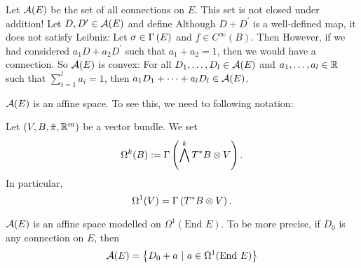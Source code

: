 \documentclass[main.tex]{subfiles}
\begin{document}
    Let $\mathcal{A}(E)$ be the set of all connections on $E$. This set is not closed under addition! Let $D, D^\prime \in \mathcal{A}(E)$ and define 
     Although $D + D^\prime$ is a well-defined map, it does not satisfy Leibniz: Let $\sigma \in \Gamma\left( E \right)$ and $f \in C^\infty(B)$. Then
    However, if we had considered $a_1 D + a_2 D^\prime$ such that $a_1 + a_2 = 1$, then we would have a connection. So $\mathcal{A}(E)$ is convex: For all $D_1, \dots, D_l \in \mathcal{A}(E)$ and $a_1, \dots, a_l \in \mathbb{R}$ such that $\sum_{i=1}^l a_i = 1$, then $a_1D_1 + \dots + a_l D_l \in \mathcal{A}(E)$.
    
    $\mathcal{A}(E)$ is an affine space. To see this, we need to following notation:
    
    \begin{notation}
    Let $(V, B, \tilde{\pi}, \mathbb{R}^m)$ be a vector bundle. We set
    \[
    \Omega^k(B) := \Gamma\left( \bigwedge^k T^*B \otimes V \right).
    \] In particular, 
    \[
    \Omega^1(V) = \Gamma\left( T^*B \otimes V \right).
    \]
    \end{notation}

    \begin{prop}
    $\mathcal{A}(E)$ is an affine space modelled on $\Omega^1(\text{End }E)$. To be more precise, if $D_0$ is any connection on $E$, then
    \[
    \mathcal{A}(E) = \left\{ D_0 + a \ | \  a \in \Omega^1(\text{End } E) \right\}
    \]
    \end{prop}
\end{document}
